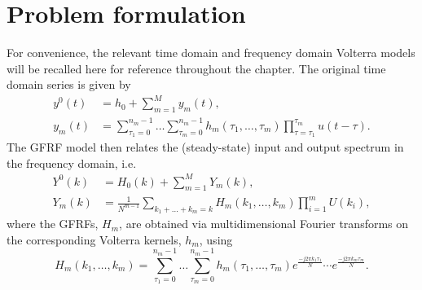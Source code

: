 \section{Problem formulation}
\label{sec:ProblemFormulation_GFRFs}

For convenience, the relevant time domain and frequency domain Volterra models will be recalled here for reference throughout the chapter. The original time domain series is given by
\begin{equation}
\begin{split}
y^0(t) &= h_0 + \sum_{m=1}^M y_m(t), \\
y_m(t) &= \sum_{\tau_1 = 0}^{n_m-1} \hdots \sum_{\tau_m=0}^{n_m-1} h_m(\tau_1, \hdots, \tau_m) \prod_{\tau=\tau_1}^{\tau_m} u(t-\tau).
\end{split}
\label{eq:VolterraTimeDomainOutput_GFRFs}
\end{equation}
The GFRF model then relates the (steady-state) input and output spectrum in the frequency domain, i.e.
\begin{equation}
\begin{split}
Y^0(k) &= H_0(k) + \sum_{m=1}^{M} Y_m(k),  \\
Y_m(k) &= \frac{1}{N^{m-1}} \sum_{k_1 + \hdots + k_m = k} H_m(k_1, \hdots,k_m) \prod_{i=1}^{m} U(k_i), 
\end{split}
\label{eqn:GFRFoutputeqn_GFRFs}
\end{equation}
where the GFRFs, $H_m$, are obtained via multidimensional Fourier transforms on the corresponding Volterra kernels, $h_m$, using
\begin{equation}
\label{eqn:GFRF_Transform_GFRFs}
H_m(k_1, \hdots,k_m) = \sum_{\tau_1=0}^{n_m - 1} \hdots \sum_{\tau_m=0}^{n_m-1} h_m(\tau_1,\hdots,\tau_m) e^{\frac{-j2 \pi k_1 \tau_1}{N}} \cdots e^{\frac{-j2 \pi k_m \tau_m}{N}}.
\end{equation}

